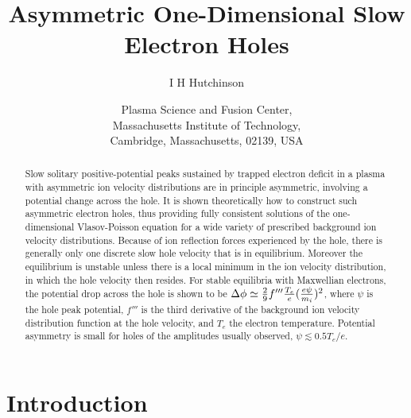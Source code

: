 \documentclass[pre]{revtex4-2}
\def\affiliation#1{\date{\normalsize #1}}
\begin{document}
\title{Asymmetric One-Dimensional Slow Electron Holes}
\author{I H Hutchinson}
\affiliation{Plasma Science and Fusion Center,\\ Massachusetts Institute of
  Technology,\\ Cambridge, Massachusetts, 02139, USA}

\ifx\altaffiliation\undefined\maketitle\fi %
\begin{abstract}
  Slow solitary positive-potential peaks sustained by trapped electron
  deficit in a plasma with asymmetric ion velocity distributions are
  in principle asymmetric, involving a potential change across the
  hole.  It is shown theoretically how to construct such asymmetric
  electron holes, thus providing fully consistent solutions of the
  one-dimensional Vlasov-Poisson equation for a wide variety of
  prescribed background ion velocity distributions. Because of ion
  reflection forces experienced by the hole, there is generally only
  one discrete slow hole velocity that is in equilibrium. Moreover the
  equilibrium is unstable unless there is a local minimum in the ion
  velocity distribution, in which the hole velocity then resides. For
  stable equilibria with Maxwellian electrons, the potential drop
  across the hole is shown to be
  $\Delta\phi\simeq{2\over 9}f'''{T_e\over e}({e\psi\over m_i})^2$, where
  $\psi$ is the hole peak potential, $f'''$ is the third derivative of
  the background ion velocity distribution function at the hole
  velocity, and $T_e$ the electron temperature. Potential asymmetry is
  small for holes of the amplitudes usually observed,
  $\psi\lesssim 0.5T_e/e$.
\end{abstract}
\ifx\altaffiliation\undefined\else\maketitle\fi  %

\section{Introduction}
\end{document}
